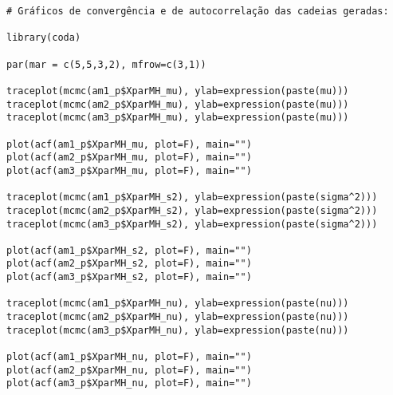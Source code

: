 \begin{verbatim}
# Gráficos de convergência e de autocorrelação das cadeias geradas:

library(coda)

par(mar = c(5,5,3,2), mfrow=c(3,1))

traceplot(mcmc(am1_p$XparMH_mu), ylab=expression(paste(mu)))
traceplot(mcmc(am2_p$XparMH_mu), ylab=expression(paste(mu)))
traceplot(mcmc(am3_p$XparMH_mu), ylab=expression(paste(mu)))

plot(acf(am1_p$XparMH_mu, plot=F), main="")
plot(acf(am2_p$XparMH_mu, plot=F), main="")
plot(acf(am3_p$XparMH_mu, plot=F), main="")

traceplot(mcmc(am1_p$XparMH_s2), ylab=expression(paste(sigma^2)))
traceplot(mcmc(am2_p$XparMH_s2), ylab=expression(paste(sigma^2)))
traceplot(mcmc(am3_p$XparMH_s2), ylab=expression(paste(sigma^2)))

plot(acf(am1_p$XparMH_s2, plot=F), main="")
plot(acf(am2_p$XparMH_s2, plot=F), main="")
plot(acf(am3_p$XparMH_s2, plot=F), main="")

traceplot(mcmc(am1_p$XparMH_nu), ylab=expression(paste(nu)))
traceplot(mcmc(am2_p$XparMH_nu), ylab=expression(paste(nu)))
traceplot(mcmc(am3_p$XparMH_nu), ylab=expression(paste(nu)))

plot(acf(am1_p$XparMH_nu, plot=F), main="")
plot(acf(am2_p$XparMH_nu, plot=F), main="")
plot(acf(am3_p$XparMH_nu, plot=F), main="")
\end{verbatim}